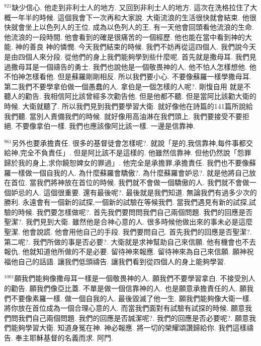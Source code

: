 \documentclass{book}
\begin{document}
$^{921}$缺少信心.
他走到非利士人的地方.
又回到非利士人的地方.
這次在洗格拉住了大概一年半的時候.
這個我會下一次再和大家說.
大衛流浪的生活很快就會結束.
他很快就會坐上以色列人的王位.
成為以色列人的王.
有一天他會回頭看他流浪的生命.
他流浪的一段時間.
他會看到的確是很痛苦的一個經歷.
他也能在當中看到神的大能.
神的善良 神的憐憫.
今天我們結束的時候.
我們不妨再從這四個人.
我們說今天是由四個人來分段.
從他們的身上我們能夠學到些什麼呢.
首先就是撒母耳.
我們見過撒母耳是一個禱告的勇士.
我們也說他是一個敬畏神的人.
他不怕人怎樣想他.
他不怕神怎樣看他.
但是蘇羅剛剛相反.
所以我們要小心.
不要像蘇羅一樣學撒母耳.
第二我們不要學拿伯做一個愚蠢的人.
拿伯是一個怎樣的人呢?.
剛愎自用 就是不聽人的勸告.
我相信阿比該曾經多次勸告他.
但是他都不聽.
但是當阿比該勸大衛的時候.
大衛就聽了.
所以我們見到我們要學習大衛.
就好像他在詩篇的141篇所說給我們聽.
當別人責備我們的時候.
就好像用高油淋在我們頭上.
我們要接受不要拒絕.
不要像拿伯一樣.
我們也應該像阿比該一樣.
一邊是信靠神.

$^{961}$另外也要承擔責任.
很多的基督徒會怎樣呢?.
就說「是的,我信靠神,每件事都交給神,完全不負責任」.
但是阿比該不是這樣的.
他雖然信靠神.
但他仍然說「怨罪歸於我的身上,求你饒恕婢女的罪過」.
他完全是承擔罪,承擔責任.
我們也不要像蘇羅一樣做一個自我的人.
為什麼蘇羅會驕傲?.
為什麼蘇羅會妒忌?.
就是他將自己放在首位.
當我們將神放在首位的時候.
我們就不會做一個驕傲的人.
我們就不會做一個妒忌的人.
這個很重要.
還有最後呢?.
最後就是我們知道.
無論我們有過多少次的勝利.
永遠會有一個新的試探,一個新的試驗在等候我們.
當我們遇見有新的試探,試驗的時候.
我們要怎樣做呢?.
首先我們要問問我們自己兩個問題.
我們的回應是否聖潔?.
我們見到大衛.
雖然他是合神心意的人.
很多時候他做出來的事未必是這麼聖潔.
他會說謊.
他會用他自己的手段.
我們要問自己.
首先我們的回應是否聖潔?.
第二呢?.
我們所做的事是否必要?.
大衛就是求神幫助自己來信願.
他有機會也不去報仇.
他就知道他所做的不是必要.
留待神來報應.
留待神來為自己來信願.
願神祝福他自己的話語.
讓我們低頭禱告.
讓我們看到從四個人的身上能夠學習.

$^{1001}$願我們能夠像撒母耳一樣是一個敬畏神的人.
願我們不要學習拿白.
不接受別人的勸告.
願我們像亞比蓋.
不單是做一個信靠神的人.
也是願意承擔責任的人.
願我們不要像素羅一樣.
做一個自我的人.
最後毀滅了他一生.
願我們能夠像大衛一樣.
將你放在首位成為一個合理心意的人.
而當我們面對有試驗有試探的時候.
願意我們問我們自己兩個問題.
我們的回應是否誠潔呢?.
我們的回應是否必要呢?.
願意我們能夠學習大衛.
知道身冤在神.
神必報應.
將一切的榮耀頌讚歸給你.
我們這樣禱告.
奉主耶穌基督的名義而求.
阿門.
\newpage
\end{document}
